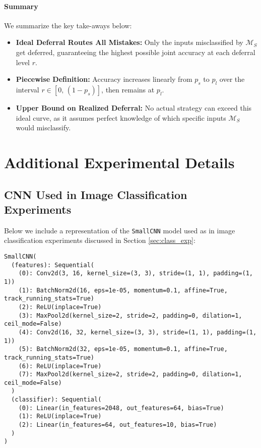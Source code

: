 \paragraph{Summary} We summarize the key take-aways below:
\begin{itemize}
    \item \textbf{Ideal Deferral Routes All Mistakes:} Only the inputs misclassified by \(\mathcal{M}_S\) get deferred, guaranteeing the highest possible joint accuracy at each deferral level \(r\).
    \item \textbf{Piecewise Definition:} Accuracy increases linearly from \(p_s\) to \(p_l\) over the interval \(r \in [0,\, (1 - p_s)]\), then remains at \(p_l\).
    \item \textbf{Upper Bound on Realized Deferral:} No actual strategy can exceed this ideal curve, as it assumes perfect knowledge of which specific inputs \(\mathcal{M}_S\) would misclassify.
\end{itemize}



\section{Additional Experimental Details}

\subsection{CNN Used in Image Classification Experiments}

Below we include a representation of the \texttt{SmallCNN} model used as \smallmodel in image classification experiments discussed in Section \ref{sec:class_exp}:

\begin{lstlisting}[]
SmallCNN(
  (features): Sequential(
    (0): Conv2d(3, 16, kernel_size=(3, 3), stride=(1, 1), padding=(1, 1))
    (1): BatchNorm2d(16, eps=1e-05, momentum=0.1, affine=True, track_running_stats=True)
    (2): ReLU(inplace=True)
    (3): MaxPool2d(kernel_size=2, stride=2, padding=0, dilation=1, ceil_mode=False)
    (4): Conv2d(16, 32, kernel_size=(3, 3), stride=(1, 1), padding=(1, 1))
    (5): BatchNorm2d(32, eps=1e-05, momentum=0.1, affine=True, track_running_stats=True)
    (6): ReLU(inplace=True)
    (7): MaxPool2d(kernel_size=2, stride=2, padding=0, dilation=1, ceil_mode=False)
  )
  (classifier): Sequential(
    (0): Linear(in_features=2048, out_features=64, bias=True)
    (1): ReLU(inplace=True)
    (2): Linear(in_features=64, out_features=10, bias=True)
  )
)
\end{lstlisting}

